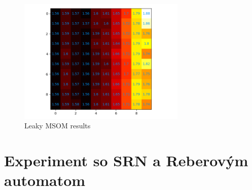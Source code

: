 \begin{figure}[H]
    \centering
    \includegraphics[width=8cm]{assets/leakymsom_abcd}
    \caption{Leaky MSOM results}
\end{figure}


\section{Experiment so SRN a Reberovým automatom}



